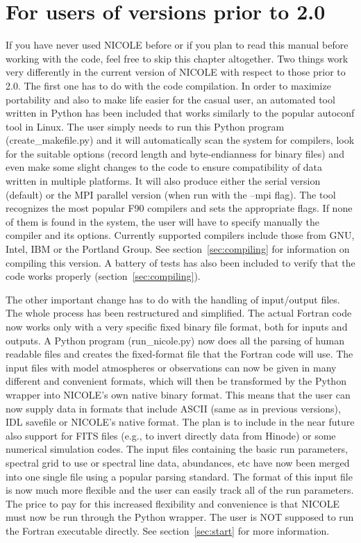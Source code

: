 \section{For users of versions prior to 2.0}

If you have never used NICOLE before or if you plan to read this manual 
before working with the code, feel free to skip this chapter altogether.
Two things work very differently in the current version of NICOLE with
respect to those prior to 2.0. The first one has to do with the code
compilation. In order to maximize portability and also
to make life easier for the casual user, an automated tool written in
Python has been included that works similarly to the popular autoconf
tool in Linux. The user simply needs to run this Python program
(create\_makefile.py) and it will automatically scan the system for
compilers, look for the suitable options (record length and
byte-endianness for binary files) and even make some slight
changes to the code to ensure compatibility of data written in
multiple platforms. It will also produce either the serial version
(default) or the MPI parallel version (when run with the --mpi
flag). The tool recognizes the most popular F90 compilers and sets the
appropriate flags. If none of them is found in the system, the user
will have to specify manually the compiler and its options. Currently
supported compilers include those from GNU, Intel, IBM or the Portland
Group. See section~\ref{sec:compiling} for information on compiling
this version. A battery of tests has also been included to verify that
the code works properly (section~\ref{sec:compiling}).

The other important change has to do with the handling of input/output
files. The whole process has been restructured and simplified. The
actual Fortran code now works only with a very specific fixed binary
file format, both for inputs and outputs. A Python program
(run\_nicole.py) now does all the parsing of human readable files and
creates the fixed-format file that the Fortran code will use. The
input files with model atmospheres or observations can now be given in
many different and convenient formats, which will then be transformed
by the Python wrapper into NICOLE's own native binary format. This
means that the user can now supply data in formats that include ASCII
(same as in previous versions), IDL savefile or NICOLE's native
format. The plan is to include in the near future also support for
FITS files (e.g., to invert directly data from Hinode) or some
numerical simulation codes. The input files containing the basic run
parameters, spectral grid to use or spectral line data, abundances,
etc have now been merged into one single file using a popular parsing
standard. The format of this input file is now much more flexible and
the user can easily track all of the run parameters. The price to pay
for this increased flexibility and convenience is that NICOLE must now
be run through the Python wrapper. The user is NOT supposed to run the
Fortran executable directly. See section~\ref{sec:start} for more information.

